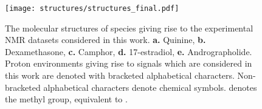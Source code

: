 \begin{figure}[h!]
    \centering
    \texttt{[image: structures/structures\_final.pdf]}
    \caption[
        The molecular structures of species giving rise to the experimental
        \acs{NMR} datasets considered in this work.
    ]{
        The molecular structures of species giving rise to the experimental
        \acs{NMR} datasets considered in this work.
        \textbf{a.} Quinine,
        \textbf{b.} Dexamethasone,
        \textbf{c.} Camphor,
        \textbf{d.} 17\textbeta-estradiol,
        \textbf{e.} Andrographolide.
        Proton environments giving rise to signals which are considered in this
        work are denoted with bracketed alphabetical characters. Non-bracketed
        alphabetical characters denote chemical symbols.  denotes the methyl
        group, equivalent to .
    }
    \label{fig:structures}
\end{figure}

